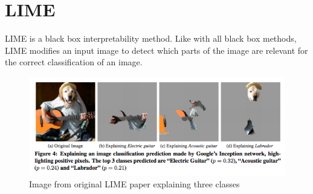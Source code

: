 \section{LIME}

LIME \cite{ribeiro2016should} is a black box interpretability method. Like with all black box methods, LIME modifies an input image to detect which parts of the image are relevant for the correct classification of an image. 


\begin{figure}[H]
\centering
\includegraphics[width=14cm]{chapters/02_methods/images/lime.png}
\caption{Image from original LIME paper explaining three classes}
\end{figure}
